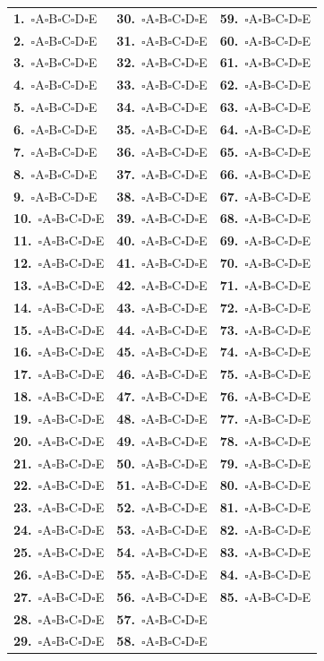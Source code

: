 \documentclass[11pt]{article}
\newcommand{\answerrow}[1]{\textbf{#1.}\ \(\square\)A\;\(\square\)B\;\(\square\)C\;\(\square\)D\;\(\square\)E}
\begin{document}
\begin{center}
\scriptsize
\setlength{\tabcolsep}{3pt}
\begin{tabular}{p{}p{}p{}}
\answerrow{1} & \answerrow{30} & \answerrow{59}\\
\answerrow{2} & \answerrow{31} & \answerrow{60}\\
\answerrow{3} & \answerrow{32} & \answerrow{61}\\
\answerrow{4} & \answerrow{33} & \answerrow{62}\\
\answerrow{5} & \answerrow{34} & \answerrow{63}\\
\answerrow{6} & \answerrow{35} & \answerrow{64}\\
\answerrow{7} & \answerrow{36} & \answerrow{65}\\
\answerrow{8} & \answerrow{37} & \answerrow{66}\\
\answerrow{9} & \answerrow{38} & \answerrow{67}\\
\answerrow{10} & \answerrow{39} & \answerrow{68}\\
\answerrow{11} & \answerrow{40} & \answerrow{69}\\
\answerrow{12} & \answerrow{41} & \answerrow{70}\\
\answerrow{13} & \answerrow{42} & \answerrow{71}\\
\answerrow{14} & \answerrow{43} & \answerrow{72}\\
\answerrow{15} & \answerrow{44} & \answerrow{73}\\
\answerrow{16} & \answerrow{45} & \answerrow{74}\\
\answerrow{17} & \answerrow{46} & \answerrow{75}\\
\answerrow{18} & \answerrow{47} & \answerrow{76}\\
\answerrow{19} & \answerrow{48} & \answerrow{77}\\
\answerrow{20} & \answerrow{49} & \answerrow{78}\\
\answerrow{21} & \answerrow{50} & \answerrow{79}\\
\answerrow{22} & \answerrow{51} & \answerrow{80}\\
\answerrow{23} & \answerrow{52} & \answerrow{81}\\
\answerrow{24} & \answerrow{53} & \answerrow{82}\\
\answerrow{25} & \answerrow{54} & \answerrow{83}\\
\answerrow{26} & \answerrow{55} & \answerrow{84}\\
\answerrow{27} & \answerrow{56} & \answerrow{85}\\
\answerrow{28} & \answerrow{57} & \\
\answerrow{29} & \answerrow{58} & \\
\end{tabular}
\end{center}
\end{document}

